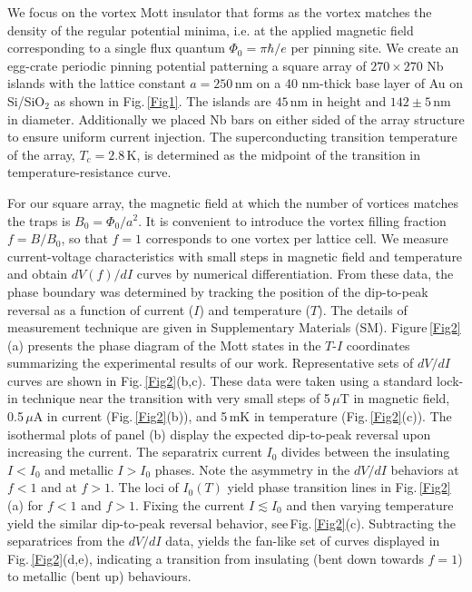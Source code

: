 \documentclass[aps,twocolumn,prl,10pt,amsmath,amssymb,nofootinbib,showpacs,superscriptaddress,floatfix]{revtex4-1}
\begin{document}
We focus on the vortex Mott insulator that forms as the vortex matches the density of the regular potential minima, i.e. at the applied magnetic field corresponding to a single flux quantum $\Phi_0=\pi\hbar/e$ per pinning site. 
We create an egg-crate periodic pinning potential 
patterning a square array of $270\times 270$ Nb islands with the lattice constant $a=250$\,nm on a 40 nm-thick base layer of Au on Si/SiO$_2$ as shown in Fig.\,\ref{Fig1}. The islands are $45$\,nm in height and $142 \pm 5$\,nm in diameter. Additionally we placed Nb bars on either sided of the array structure to ensure uniform current injection.
The superconducting transition temperature of the array, $T_c= 2.8$\,K, is determined as the
midpoint of the transition in temperature-resistance curve. 

For our square array, the magnetic field at which the number of vortices matches the traps is $B_0=\Phi_0/a^2$. 
It is convenient to introduce the vortex filling fraction $f=B/B_0$,
so that $f=1$ corresponds to one vortex per lattice cell.
We measure current-voltage characteristics with small steps in magnetic field and temperature and obtain $dV(f)/dI$ curves by numerical differentiation.
From these data, the phase boundary was determined by tracking the position of the dip-to-peak reversal as a function of current ($I$) and temperature ($T$). The details of measurement technique are given in Supplementary Materials (SM).
Figure\,\ref{Fig2}(a) presents the phase diagram of the Mott states in the $T$-$I$ coordinates summarizing the experimental results of our work. 
Representative sets of $dV/dI$ curves are shown in Fig.\,\ref{Fig2}(b,c).
These data were taken using a standard lock-in technique near the transition with very small steps of 5\,$\mu$T in magnetic field, 0.5\,$\mu$A in current (Fig.\,\ref{Fig2}(b)), and 5\,mK in temperature (Fig.\,\ref{Fig2}(c)).
The isothermal plots of panel (b) display the expected dip-to-peak reversal upon increasing the current.
The separatrix current $I_0$ divides between  
the insulating $I<I_0$ and metallic $I>I_0$ phases. 
Note the asymmetry in the $dV/dI$ behaviors at $f<1$ and at $f>1$.
The loci of $I_0(T)$ yield phase transition lines in Fig.\,\ref{Fig2}(a) for $f<1$ and $f>1$.
Fixing the current $I\lesssim I_0$ and then varying temperature 
yield the similar dip-to-peak reversal behavior, see\,Fig.\,\ref{Fig2}(c).
Subtracting the separatrices from the $dV/dI$ data, yields the fan-like set of curves displayed in Fig.\,\ref{Fig2}(d,e), indicating a transition from insulating (bent down towards $f=1$) to metallic (bent up) behaviours.
\end{document}
